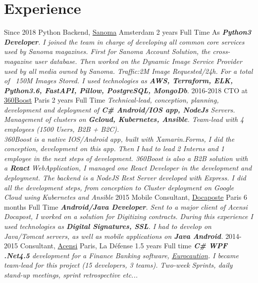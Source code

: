 \documentclass{emonides-cv}
\begin{document}
\section{Experience}
\begin{entrylist}
  \entry
    {Since 2018}
    {Python Backend, \href{https://www.sanoma.nl/over-sanoma-nl/}{Sanoma} {\normalfont Amsterdam}}
    {2 years Full Time}
    {As \emph{\textbf{Python3 Developer}. I joined the team in charge of developing all common core services used by Sanoma magazines. First for Sanoma Account Solution, the cross-magazine user database. Then worked on the Dynamic Image Service Provider used by all media owned by Sanoma. Traffic:2M Image Requested/24h. For a total of ~150M Images Stored.
    I used technologies as \textbf{AWS, Terraform, ELK, Python3.6, FastAPI, Pillow, PostgreSQL, MongoDb}.}}
  \entry
    {2016-2018}
    {CTO at \href{https://fr.linkedin.com/company/360boost/}{360Boost}  {\normalfont Paris}}
    {2 years Full Time}
    {\emph{Technical-lead, conception, planning, development and deployment of \textbf{C\# Android/IOS app, NodeJs} Servers.
     Management of clusters on \textbf{Gcloud, Kubernetes, Ansible}. Team-lead with 4 employees (1500 Users, B2B + B2C).
    \\360Boost is a native IOS/Android app, built with Xamarin.Forms, I did the conception, development on this app.
    Then I had to lead 2 Interns and 1 employee in the next steps of development.
    360Boost is also a B2B solution with a \textbf{React} WebApplication, I managed one React Developer
    in the development and deployment.
    The backend is a NodeJS Rest Server developed with Express. I did all the development steps, from conception
    to Cluster deployment on Google Cloud using Kubernetes and Ansible}}
  \entry
    {2015}
    {Mobile Consultant, \href{https://www.docapost.com/en/}{Docaposte} {\normalfont Paris}}
    {6 months Full Time}
    {\emph{\textbf{Android/Java Developer}. Sent to a major client of Acensi Docapost, I worked on a solution for Digitizing contracts.
    During this experience I used technologies as \textbf{Digital Signatures, SSL}.
    I had to develop on Java/Tomcat servers, as well as mobile applications on \textbf{Java Android}.}}
  \entry
    {2014-2015}
    {Consultant, \href{https://www.acensi.fr/}{Acensi} {\normalfont Paris, La Défense}}
    {1.5 years Full time}
    {\emph{\textbf{C\# WPF .Net4.5} development for a Finance Banking software, \href{https://www.eurocaution.net/}{Eurocaution}.
    I became team-lead for this project (15 developers, 3 teams). Two-week Sprints, daily stand-up meetings, sprint retrospective etc...
}}
\end{entrylist}
\end{document}
